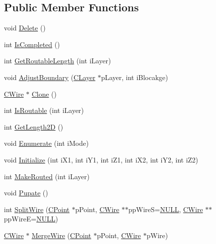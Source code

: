 \subsection*{Public Member Functions}
\begin{DoxyCompactItemize}
\item 
void \mbox{\hyperlink{classCWire_abbcbc22230d8e5a87ac4de9cbf990022}{Delete}} ()
\item 
int \mbox{\hyperlink{classCWire_a1b37fb9ea32af4a838620a368b9f3824}{Is\+Completed}} ()
\item 
int \mbox{\hyperlink{classCWire_af22afb5379acf1aa890692416c00b8e4}{Get\+Routable\+Length}} (int i\+Layer)
\item 
void \mbox{\hyperlink{classCWire_a36dd73e309fe16428df29220bc161d0e}{Adjust\+Boundary}} (\mbox{\hyperlink{classCLayer}{C\+Layer}} $\ast$p\+Layer, int i\+Blocakge)
\item 
\mbox{\hyperlink{classCWire}{C\+Wire}} $\ast$ \mbox{\hyperlink{classCWire_a79a2ddae76fd8d2e0a96309077d5a550}{Clone}} ()
\item 
int \mbox{\hyperlink{classCWire_a3db1c3578cdf422a84a1f796460a9f9e}{Is\+Routable}} (int i\+Layer)
\item 
int \mbox{\hyperlink{classCWire_a54f754e7404cb275e2eed0e8b281817f}{Get\+Length2D}} ()
\item 
void \mbox{\hyperlink{classCWire_aa9ee88d6fd7117d3029c5a910c7957af}{Enumerate}} (int i\+Mode)
\item 
void \mbox{\hyperlink{classCWire_a32e6d904a2f532d7b6d489d8ffe4884f}{Initialize}} (int i\+X1, int i\+Y1, int i\+Z1, int i\+X2, int i\+Y2, int i\+Z2)
\item 
int \mbox{\hyperlink{classCWire_a89b640e7c8363910006273372e84effa}{Make\+Routed}} (int i\+Layer)
\item 
void \mbox{\hyperlink{classCWire_afc0e5cf89e354b121793c11ac460aa52}{Pupate}} ()
\item 
int \mbox{\hyperlink{classCWire_a16b47186198867b019f35eac02b6c52e}{Split\+Wire}} (\mbox{\hyperlink{classCPoint}{C\+Point}} $\ast$p\+Point, \mbox{\hyperlink{classCWire}{C\+Wire}} $\ast$$\ast$pp\+WireS=\mbox{\hyperlink{BoxRouter_8h_a070d2ce7b6bb7e5c05602aa8c308d0c4}{N\+U\+LL}}, \mbox{\hyperlink{classCWire}{C\+Wire}} $\ast$$\ast$pp\+WireE=\mbox{\hyperlink{BoxRouter_8h_a070d2ce7b6bb7e5c05602aa8c308d0c4}{N\+U\+LL}})
\item 
\mbox{\hyperlink{classCWire}{C\+Wire}} $\ast$ \mbox{\hyperlink{classCWire_ac285ab926f7318d97773bbf31e00d4be}{Merge\+Wire}} (\mbox{\hyperlink{classCPoint}{C\+Point}} $\ast$p\+Point, \mbox{\hyperlink{classCWire}{C\+Wire}} $\ast$p\+Wire)

\end{DoxyCompactItemize}
